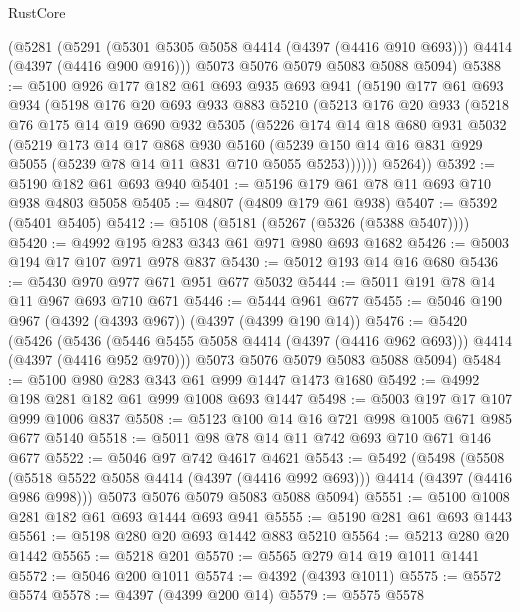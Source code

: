 \begin{lexlean}{RustCore}
\begin{coremodule}
    (@5281
      (@5291 (@5301 @5305 @5058 @4414 (@4397 (@4416 @910 @693))) @4414 (@4397 (@4416 @900 @916)))
      @5073
      @5076
      @5079
      @5083
      @5088
      @5094)
@5388 := @5100
    @926
    @177
    @182
    @61
    @693
    @935
    @693
    @941
    (@5190
      @177
      @61
      @693
      @934
      (@5198
        @176
        @20
        @693
        @933
        @883
        @5210
        (@5213
          @176
          @20
          @933
          (@5218
            @76
            @175
            @14
            @19
            @690
            @932
            @5305
            (@5226
              @174
              @14
              @18
              @680
              @931
              @5032
              (@5219
                @173
                @14
                @17
                @868
                @930
                @5160
                (@5239 @150 @14 @16 @831 @929 @5055 (@5239 @78 @14 @11 @831 @710 @5055 @5253))))))
        @5264))
@5392 := @5190 @182 @61 @693 @940
@5401 := @5196 @179 @61 @78 @11 @693 @710 @938 @4803 @5058
@5405 := @4807 (@4809 @179 @61 @938)
@5407 := @5392 (@5401 @5405)
@5412 := @5108 (@5181 (@5267 (@5326 (@5388 @5407))))
@5420 := @4992 @195 @283 @343 @61 @971 @980 @693 @1682
@5426 := @5003 @194 @17 @107 @971 @978 @837
@5430 := @5012 @193 @14 @16 @680
@5436 := @5430 @970 @977 @671 @951 @677 @5032
@5444 := @5011 @191 @78 @14 @11 @967 @693 @710 @671
@5446 := @5444 @961 @677
@5455 := @5046 @190 @967 (@4392 (@4393 @967)) (@4397 (@4399 @190 @14))
@5476 := @5420
    (@5426
      (@5436 (@5446 @5455 @5058 @4414 (@4397 (@4416 @962 @693))) @4414 (@4397 (@4416 @952 @970)))
      @5073
      @5076
      @5079
      @5083
      @5088
      @5094)
@5484 := @5100 @980 @283 @343 @61 @999 @1447 @1473 @1680
@5492 := @4992 @198 @281 @182 @61 @999 @1008 @693 @1447
@5498 := @5003 @197 @17 @107 @999 @1006 @837
@5508 := @5123 @100 @14 @16 @721 @998 @1005 @671 @985 @677 @5140
@5518 := @5011 @98 @78 @14 @11 @742 @693 @710 @671 @146 @677
@5522 := @5046 @97 @742 @4617 @4621
@5543 := @5492
    (@5498
      (@5508 (@5518 @5522 @5058 @4414 (@4397 (@4416 @992 @693))) @4414 (@4397 (@4416 @986 @998)))
      @5073
      @5076
      @5079
      @5083
      @5088
      @5094)
@5551 := @5100 @1008 @281 @182 @61 @693 @1444 @693 @941
@5555 := @5190 @281 @61 @693 @1443
@5561 := @5198 @280 @20 @693 @1442 @883 @5210
@5564 := @5213 @280 @20 @1442
@5565 := @5218 @201
@5570 := @5565 @279 @14 @19 @1011 @1441
@5572 := @5046 @200 @1011
@5574 := @4392 (@4393 @1011)
@5575 := @5572 @5574
@5578 := @4397 (@4399 @200 @14)
@5579 := @5575 @5578

\end{coremodule}
\end{lexlean}
